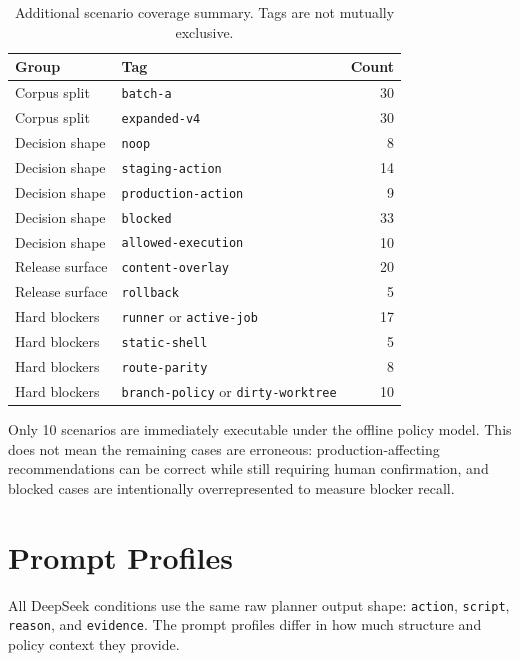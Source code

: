 \documentclass[11pt]{article}
\begin{document}
\begin{table}[t]
\centering
\small
\begin{tabular}{@{}llr@{}}
\toprule
Group & Tag & Count \\
\midrule
Corpus split & \texttt{batch-a} & 30 \\
Corpus split & \texttt{expanded-v4} & 30 \\
Decision shape & \texttt{noop} & 8 \\
Decision shape & \texttt{staging-action} & 14 \\
Decision shape & \texttt{production-action} & 9 \\
Decision shape & \texttt{blocked} & 33 \\
Decision shape & \texttt{allowed-execution} & 10 \\
Release surface & \texttt{content-overlay} & 20 \\
Release surface & \texttt{rollback} & 5 \\
Hard blockers & \texttt{runner} or \texttt{active-job} & 17 \\
Hard blockers & \texttt{static-shell} & 5 \\
Hard blockers & \texttt{route-parity} & 8 \\
Hard blockers & \texttt{branch-policy} or \texttt{dirty-worktree} & 10 \\
\bottomrule
\end{tabular}
\caption{Additional scenario coverage summary. Tags are not mutually exclusive.}
\label{tab:appendix-coverage}
\end{table}

Only 10 scenarios are immediately executable under the offline policy model. This does not mean the remaining cases are erroneous: production-affecting recommendations can be correct while still requiring human confirmation, and blocked cases are intentionally overrepresented to measure blocker recall.

\section{Prompt Profiles}
\label{app:prompt-profiles}

All DeepSeek conditions use the same raw planner output shape: \texttt{action}, \texttt{script}, \texttt{reason}, and \texttt{evidence}. The prompt profiles differ in how much structure and policy context they provide.
\end{document}

